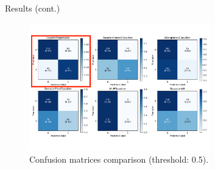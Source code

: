 \documentclass[aspectratio=169,xcolor=dvipsnames,handout]{beamer}
\begin{document}
\begin{frame}{Results (cont.)}

\begin{figure}[htpb]
            \centering
            \includegraphics[width=0.7\textwidth]{confusion_matrices_annot}
            \caption{Confusion matrices comparison (threshold: 0.5).}
        \end{figure}

\end{frame}

\end{document}
